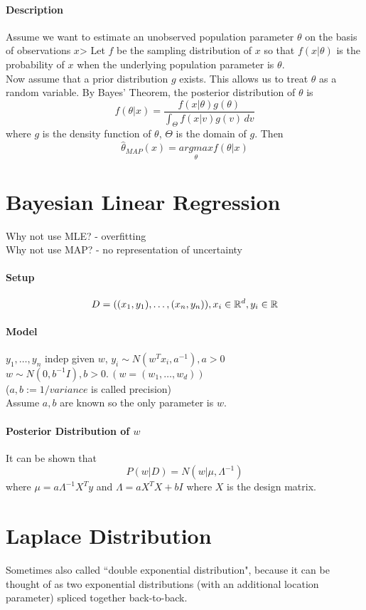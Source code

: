 \documentclass[11pt]{article}
\begin{document}
\paragraph{Description}
Assume we want to estimate an unobserved population parameter $\theta$ on the basis of observations $x$> Let $f$ be the sampling distribution of $x$ so that $f(x|\theta)$ is the probability of $x$ when the underlying population parameter is $\theta$. \\
Now assume that a prior distribution $g$ exists. This allows us to treat $\theta$ as a random variable. By Bayes' Theorem, the posterior distribution of $\theta$ is 
$$f(\theta|x) = \frac{f(x|\theta)g(\theta)}{\int_\Theta f(x|v)g(v)\,dv}$$
where $g$ is the density function of $\theta$, $\Theta$ is the domain of $g$.
Then
$$\hat{\theta}_{MAP}(x) = \underset{\theta}{argmax} f(\theta|x)$$
\section{Bayesian Linear Regression}
Why not use MLE? - overfitting \\
Why not use MAP? - no representation of uncertainty
\paragraph{Setup}
$$D = ((x_1, y_1), \hdots, (x_n, y_n)), x_i \in \mathbb{R}^d, y_i \in \mathbb{R}$$
\paragraph{Model}
$y_1, \hdots, y_n$ indep given $w$, $y_i \sim N(w^Tx_i, a^{-1}), a>0$ \\
$w \sim N(0,b^{-1}I), b>0. \, (w=(w_1,\hdots,w_d))$ \\
($a, b:= 1/ variance$ is called precision) \\
Assume $a,b$ are known so the only parameter is $w$.
\paragraph{Posterior Distribution of $w$}
It can be shown that $$P(w|D) = N(w|\mu, \Lambda^{-1})$$
where $\mu = a\Lambda^{-1}X^Ty$ and $\Lambda = aX^TX+bI$ where $X$ is the design matrix.
\section{Laplace Distribution}
Sometimes also called ``double exponential distribution", because it can be thought of as two exponential distributions (with an additional location parameter) spliced together back-to-back.
\end{document}

